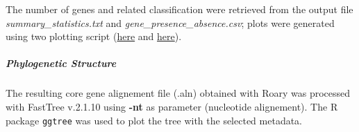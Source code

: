 The number of genes and related classification were retrieved from the output file
\textit{summary\_statistics.txt} and \textit{gene\_presence\_absence.csv}; plots were generated using two
plotting script (\href{https://github.com/sanger-pathogens/Roary/blob/master/bin/create_pan_genome_plots.R}{here}
and \href{https://github.com/sanger-pathogens/Roary/blob/master/contrib/roary_plots/roary_plots.py}{here}).


\subparagraph*{Phylogenetic Structure}

The resulting core gene alignement file (.aln) obtained with Roary was processed with FastTree v.2.1.10
using \textbf{-nt} as parameter (nucleotide alignement). The R package \texttt{ggtree} was used to plot
the tree with the selected metadata.





